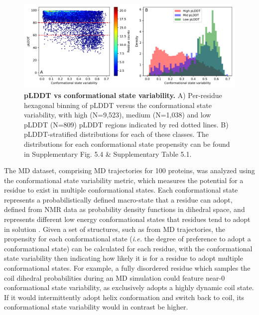 \begin{figure}[htb!]
    \centering
    \includegraphics[width=\textwidth]{pLDDT/plddt_figures/plddt_vs_conformational_state_variability_hexbin_complete_hist.pdf}
    \caption{\textbf{pLDDT vs conformational state variability.} 
    A) Per-residue hexagonal binning of pLDDT versus the conformational state variability, with high (N=9,523), medium (N=1,038) and low pLDDT (N=809) pLDDT regions indicated by red dotted lines. B) pLDDT-stratified distributions for each of these classes. The distributions for each conformational state propensity can be found in Supplementary Fig. 5.4 \& Supplementary Table 5.1. 
    }
    \label{fig:plddt_vs_conf_state_undivided}
\end{figure}

The MD dataset, comprising MD trajectories for 100 proteins, was analyzed using the conformational state variability metric, which measures the potential for a residue to exist in multiple conformational states. Each conformational state represents a probabilistically defined macro-state that a residue can adopt, defined from NMR data as probability density functions in dihedral space, and represents different low energy conformational states that residues tend to adopt in solution \cite{gavalda-garcia_data-driven_2024}. Given a set of structures, such as from MD trajectories, the propensity for each conformational state (\textit{i.e.} the degree of preference to adopt a conformational state) can be calculated for each residue, with the conformational state variability then indicating how likely it is for a residue to adopt multiple conformational states. For example, a fully disordered residue which samples the coil dihedral probabilities during an MD simulation could feature near-0 conformational state variability, as exclusively adopts a highly dynamic coil state. If it would intermittently adopt helix conformation and switch back to coil, its conformational state variability would in contrast be higher. 

